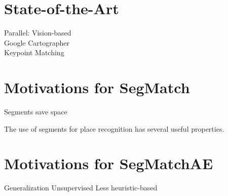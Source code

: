 \section{State-of-the-Art}
\label{sec:SOTA}

Parallel: Vision-based\\
Google Cartographer\\
Keypoint Matching\\

\section{Motivations for SegMatch}

Segments save space

The use of segments for place recognition has several useful properties.

\section{Motivations for SegMatchAE}

Generalization
Unsupervised
Less heuristic-based

